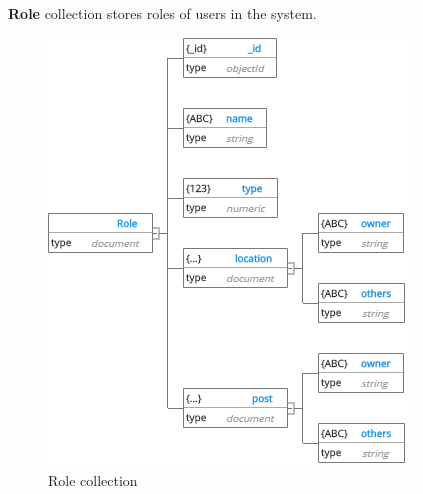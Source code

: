 \textbf{Role} collection stores roles of users in the system.
\begin{center}
	\begin{figure}[H]
		\centering
		\includegraphics[width=0.7\columnwidth]{images/chap4/Role.png}
		\caption{Role collection}
	\end{figure}
\end{center}
\cleardoublepage
